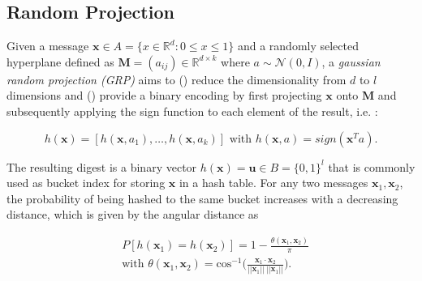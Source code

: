 \subsection{Random Projection}\label{subsec:random_projection}
Given a message $\bm{x} \in A = \{x \in \mathbb{R}^d : 0 \leq x \leq 1 \}$ and a randomly selected hyperplane defined as $\bm{M}=(a_{ij}) \in \mathbb{R}^{d \times k}$ where $a \sim \mathcal{N}(0, I)$, a \textit{gaussian random projection (GRP)} aims to () reduce the dimensionality from $d$ to $l$ dimensions and () provide a binary encoding by first projecting $\bm{x}$ onto $\bm{M}$ and subsequently applying the sign function to each element of the result, i.e. :

\begin{equation*}
    h(\bm{x}) = [h(\bm{x}, a_1), \dots, h(\bm{x}, a_k)] \text{ with } h(\bm{x}, a) = sign(\bm{x}^Ta).
\end{equation*}

The resulting digest is a binary vector $h(\bm{x}) = \bm{u} \in B = \{0, 1\}^l$ that is commonly used as bucket index for storing $\bm{x}$ in a hash table. For any two messages $\bm{x}_1, \bm{x}_2$, the probability of being hashed to the same bucket increases with a decreasing distance, which is given by the angular distance as

\begin{align*}
    &P[h(\bm{x}_1) = h(\bm{x}_2)] = 1 - \frac{\theta(\bm{x}_1, \bm{x}_2)}{\pi} \\
    &\text{with }\theta(\bm{x}_1, \bm{x}_2) = \text{cos}^{-1} \bigg( \frac{\bm{x}_1 \cdot \bm{x}_2}{||\bm{x}_1|| \: ||\bm{x}_1||} \Bigg).
\end{align*}
